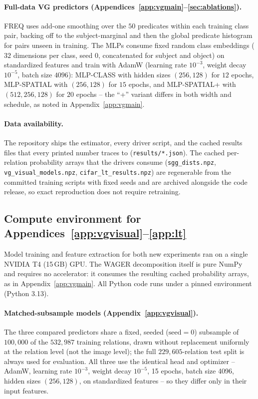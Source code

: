 \paragraph{Full-data VG predictors (Appendices~\ref{app:vgmain}--\ref{sec:ablations}).}
FREQ uses add-one smoothing over the $50$ predicates within each training class pair,
backing off to the subject-marginal and then the global predicate histogram for pairs
unseen in training. The MLPs consume fixed random class embeddings
($32$ dimensions per class, seed $0$, concatenated for subject and object) on
standardized features and train with AdamW (learning rate $10^{-3}$, weight decay
$10^{-5}$, batch size $4096$): MLP-CLASS with hidden sizes $(256,128)$ for $12$ epochs,
MLP-SPATIAL with $(256,128)$ for $15$ epochs, and MLP-SPATIAL+ with $(512,256,128)$ for
$20$ epochs -- the ``+'' variant differs in both width and schedule, as noted in
Appendix~\ref{app:vgmain}.

\paragraph{Data availability.} The repository ships the estimator, every driver script,
and the cached results files that every printed number traces to
(\texttt{results/*.json}). The cached per-relation probability arrays that the drivers
consume (\texttt{sgg\_dists.npz}, \texttt{vg\_visual\_models.npz},
\texttt{cifar\_lt\_results.npz}) are regenerable from the committed training scripts
with fixed seeds and are archived alongside the code release, so exact reproduction
does not require retraining.

\subsection{Compute environment for Appendices~\ref{app:vgvisual}--\ref{app:lt}}\label{app:compute}

Model training and feature extraction for both new experiments ran on a single NVIDIA
T4 (15\,GB) GPU. The WAGER decomposition itself is pure NumPy and requires no
accelerator: it consumes the resulting cached probability arrays, as in
Appendix~\ref{app:vgmain}. All Python code runs under a pinned environment (Python 3.13).

\paragraph{Matched-subsample models (Appendix~\ref{app:vgvisual}).} The three compared
predictors share a fixed, seeded ($\text{seed}=0$) subsample of $100{,}000$ of the
$532{,}987$ training relations, drawn without replacement uniformly at the relation
level (not the image level); the full $229{,}605$-relation test split is always used for
evaluation. All three use the identical head and optimizer -- AdamW, learning rate
$10^{-3}$, weight decay $10^{-5}$, 15 epochs, batch size 4096, hidden sizes
$(256,128)$, on standardized features -- so they differ only in their input features.

